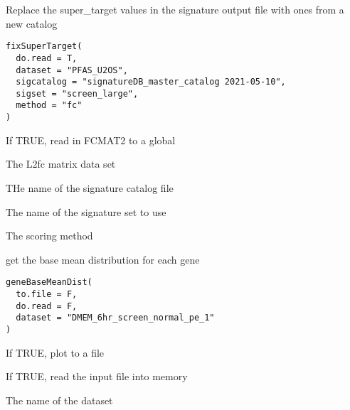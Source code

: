 \documentclass[letterpaper]{book}
\begin{document}
%
\begin{Description}\relax
Replace the super\_target values in the signature output file
with ones from a new catalog
\end{Description}
%
\begin{Usage}
\begin{verbatim}
fixSuperTarget(
  do.read = T,
  dataset = "PFAS_U2OS",
  sigcatalog = "signatureDB_master_catalog 2021-05-10",
  sigset = "screen_large",
  method = "fc"
)
\end{verbatim}
\end{Usage}
%
\begin{Arguments}
\begin{ldescription}
\item[\code{do.read}] If TRUE, read in FCMAT2 to a global

\item[\code{dataset}] The L2fc matrix data set

\item[\code{sigcatalog}] THe name of the signature catalog file

\item[\code{sigset}] The name of the signature set to use

\item[\code{method}] The scoring method
\end{ldescription}
\end{Arguments}
%
\begin{Description}\relax
get the base mean distribution for each gene
\end{Description}
%
\begin{Usage}
\begin{verbatim}
geneBaseMeanDist(
  to.file = F,
  do.read = F,
  dataset = "DMEM_6hr_screen_normal_pe_1"
)
\end{verbatim}
\end{Usage}
%
\begin{Arguments}
\begin{ldescription}
\item[\code{to.file}] If TRUE, plot to a file

\item[\code{do.read}] If TRUE, read the input file into memory

\item[\code{dataset}] The name of the dataset
\end{ldescription}
\end{Arguments}
\end{document}
